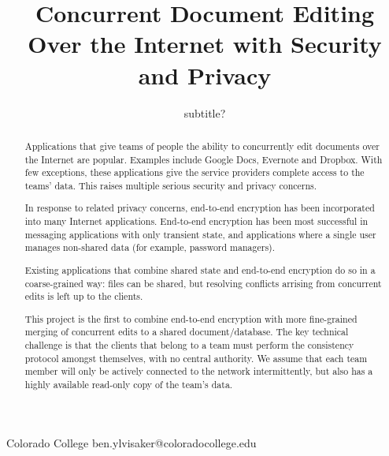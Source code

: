 \documentclass[pldi,10pt]{sigplanconf-pldi16}
\begin{document}
\newcommand{\subscr}[2]{{$\textrm{#1}_{#2}$}}
\newcommand{\LoginSalt}[1]{{$\textrm{LoginSalt}_{#1}$}}
\newcommand{\LoginKey}[1]{{$\textrm{LoginKey}_{#1}$}}
\newcommand{\MainKey}[1]{{$\textrm{MainKey}_{#1}$}}

\setlength{\pdfpageheight}{\paperheight}
\setlength{\pdfpagewidth}{\paperwidth}



\title{Concurrent Document Editing Over the Internet with Security and Privacy}
\subtitle{subtitle?}

           {Colorado College}
           {ben.ylvisaker@coloradocollege.edu}

\maketitle

\begin{abstract}

Applications that give teams of people the ability to concurrently edit documents over the Internet are popular.
Examples include Google Docs, Evernote and Dropbox.
With few exceptions, these applications give the service providers complete access to the teams' data.
This raises multiple serious security and privacy concerns.

In response to related privacy concerns, end-to-end encryption has been incorporated into many Internet applications.
End-to-end encryption has been most successful in messaging applications with only transient state, and applications where a single user manages non-shared data (for example, password managers).

Existing applications that combine shared state and end-to-end encryption do so in a coarse-grained way: files can be shared, but resolving conflicts arrising from concurrent edits is left up to the clients.

This project is the first to combine end-to-end encryption with more fine-grained merging of concurrent edits to a shared document/database.
The key technical challenge is that the clients that belong to a team must perform the consistency protocol amongst themselves, with no central authority.
We assume that each team member will only be actively connected to the network intermittently, but also has a highly available read-only copy of the team's data.

\end{abstract}
\end{document}
